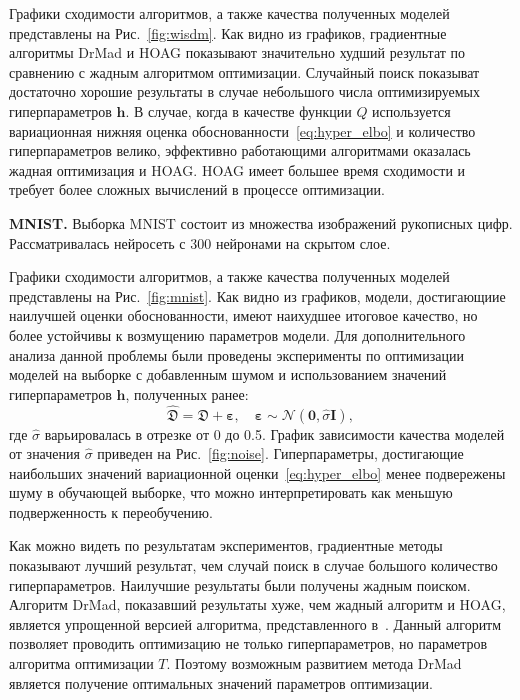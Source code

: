 Графики сходимости алгоритмов, а также качества полученных моделей представлены на Рис.~\ref{fig:wisdm}.
Как видно из графиков, градиентные алгоритмы DrMad и HOAG показывают значительно худший результат по сравнению с жадным алгоритмом оптимизации. Случайный поиск показыват достаточно хорошие результаты в случае небольшого числа оптимизируемых гиперпараметров $\mathbf{h}$. В случае, когда в качестве функции $Q$ используется вариационная нижняя оценка обоснованности~\eqref{eq:hyper_elbo} и количество гиперпараметров велико, эффективно работающими алгоритмами оказалась жадная оптимизация и HOAG. HOAG имеет большее время сходимости и требует более сложных вычислений в процессе оптимизации.


\textbf{MNIST. }
Выборка MNIST состоит из множества изображений рукописных цифр.
Рассматривалась нейросеть с 300 нейронами на скрытом слое.

Графики сходимости алгоритмов, а также качества полученных моделей представлены на Рис.~\ref{fig:mnist}.
Как видно из графиков, модели, достигающиие наилучшей оценки обоснованности, имеют наихудшее итоговое качество, но более устойчивы к возмущению параметров модели. Для дополнительного анализа данной проблемы были проведены эксперименты по оптимизации моделей на выборке с добавленным шумом и использованием значений гиперпараметров $\mathbf{h}$, полученных ранее:
\[
    \hat{\mathfrak{D}} = \mathfrak{D} + \boldsymbol{\varepsilon}, \quad   \boldsymbol{\varepsilon} \sim \mathcal{N}(\mathbf{0}, \hat{\sigma}\mathbf{I}),
\]
где $\hat{\sigma}$ варьировалась в отрезке от 0 до 0.5.
График зависимости качества моделей от значения $\hat{\sigma}$ приведен на Рис.~\ref{fig:noise}.  Гиперпараметры, достигающие наибольших значений вариационной оценки~\eqref{eq:hyper_elbo} менее подвережены шуму в обучающей выборке, что можно интерпретировать как меньшую подверженность к переобучению.

Как можно видеть по результатам экспериментов, градиентные методы показывают лучший результат, чем случай поиск в случае большого количество гиперпараметров. Наилучшие результаты были получены жадным поиском. Алгоритм DrMad, показавший результаты хуже, чем жадный алгоритм и HOAG, является упрощенной версией алгоритма, представленного в~\cite{hyper_mad}. Данный алгоритм позволяет проводить оптимизацию не только гиперпараметров, но параметров алгоритма оптимизации $T$. Поэтому возможным развитием  метода DrMad является получение оптимальных значений параметров оптимизации.



